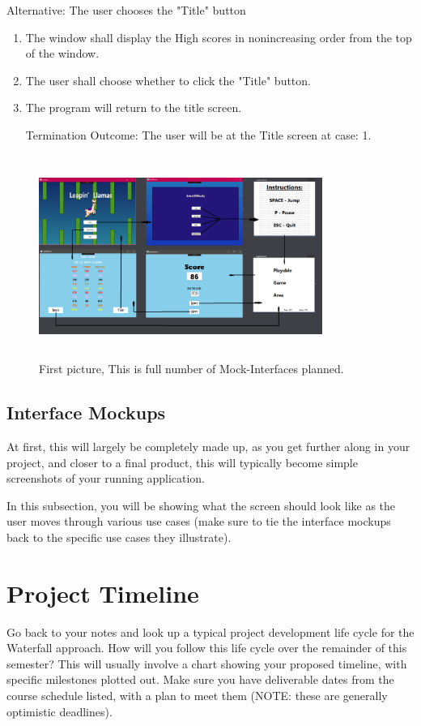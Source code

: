 \documentclass[10pt,conference,onecolumn,compsoc]{IEEEtran}
\begin{document}
Alternative: The user chooses the "Title" button
\begin{enumerate}
\item The window shall display the High scores in nonincreasing order from the top of the window.
\item The user shall choose whether to click the "Title" button.
\item The program will return to the title screen.
\item[Termination Outcome:] The user will be at the Title screen at case: 1. 
\end{enumerate}


\begin{figure}[ht!]
\includegraphics[height=250px, width=350px]{Mockup.png}
\caption{First picture, This is full number of Mock-Interfaces planned.}
\label{Complete mockup}
\end{figure}


\subsection{Interface Mockups}
At first, this will largely be completely made up, as you get further along in your project, and closer to a final product, this will typically become simple screenshots of your running application.

In this subsection, you will be showing what the screen should look like as the user moves through various use cases (make sure to tie the interface mockups back to the specific use cases they illustrate).



\section{Project Timeline}
Go back to your notes and look up a typical project development life cycle for the Waterfall approach.  How will you follow this life cycle over the remainder of this semester?  This will usually involve a chart showing your proposed timeline, with specific milestones plotted out.  Make sure you have deliverable dates from the course schedule listed, with a plan to meet them (NOTE: these are generally optimistic deadlines).
\end{document}
